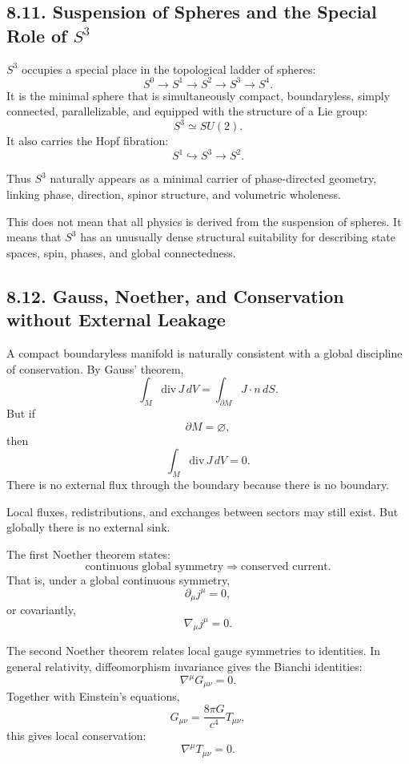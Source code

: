\documentclass[12pt,a4paper]{article}
\theoremstyle{definition}
\begin{document}
\subsection*{8.11. Suspension of Spheres and the Special Role of \(S^3\)}

\(S^3\) occupies a special place in the topological ladder of spheres:
\[
S^0\to S^1\to S^2\to S^3\to S^4.
\]
It is the minimal sphere that is simultaneously compact, boundaryless, simply connected, parallelizable, and equipped with the structure of a Lie group:
\[
S^3\simeq SU(2).
\]
It also carries the Hopf fibration:
\[
S^1\hookrightarrow S^3\to S^2.
\]

Thus \(S^3\) naturally appears as a minimal carrier of phase-directed geometry, linking phase, direction, spinor structure, and volumetric wholeness.

This does not mean that all physics is derived from the suspension of spheres. It means that \(S^3\) has an unusually dense structural suitability for describing state spaces, spin, phases, and global connectedness.

\subsection*{8.12. Gauss, Noether, and Conservation without External Leakage}

A compact boundaryless manifold is naturally consistent with a global discipline of conservation. By Gauss' theorem,
\[
\int_M \mathrm{div}\,J\,dV=\int_{\partial M}J\cdot n\,dS.
\]
But if
\[
\partial M=\varnothing,
\]
then
\[
\int_M \mathrm{div}\,J\,dV=0.
\]
There is no external flux through the boundary because there is no boundary.

Local fluxes, redistributions, and exchanges between sectors may still exist. But globally there is no external sink.

The first Noether theorem \cite{Noether1918} states:
\[
\text{continuous global symmetry}\Rightarrow \text{conserved current}.
\]
That is, under a global continuous symmetry,
\[
\partial_\mu j^\mu=0,
\]
or covariantly,
\[
\nabla_\mu j^\mu=0.
\]

The second Noether theorem relates local gauge symmetries to identities. In general relativity, diffeomorphism invariance gives the Bianchi identities:
\[
\nabla^\mu G_{\mu\nu}=0.
\]
Together with Einstein's equations,
\[
G_{\mu\nu}=\frac{8\pi G}{c^4}T_{\mu\nu},
\]
this gives local conservation:
\[
\nabla^\mu T_{\mu\nu}=0.
\]
\end{document}
